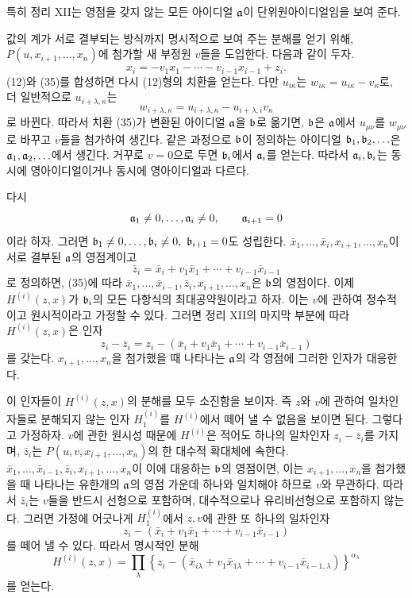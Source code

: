 특히 정리 XII는 영점을 갖지 않는 모든 아이디얼 \(\mathfrak a\)이 단위원아이디얼임을 보여 준다.

값의 계가 서로 결부되는 방식까지 명시적으로 보여 주는 분해를 얻기 위해, \(P(u,x_{i+1},\ldots,x_n)\)에 첨가할 새 부정원 \(v\)들을 도입한다. 다음과 같이 두자.
\begin{equation}
x_i=-v_1x_1-\cdots-v_{i-1}x_{i-1}+z_i.
\tag{35}
\end{equation}
(12)와 (35)를 합성하면 다시 (12)형의 치환을 얻는다. 다만 \(u_{i\kappa}\)는 \(w_{i\kappa}=u_{i\kappa}-v_\kappa\)로, 더 일반적으로 \(u_{i+\lambda,\kappa}\)는
\[
w_{i+\lambda,\kappa}
=u_{i+\lambda,\kappa}-u_{i+\lambda,i}v_\kappa
\]
로 바뀐다. 따라서 치환 (35)가 변환된 아이디얼 \(\mathfrak a\)을 \(\mathfrak b\)로 옮기면, \(\mathfrak b\)은 \(\mathfrak a\)에서 \(u_{\mu\nu}\)를 \(w_{\mu\nu}\)로 바꾸고 \(v\)들을 첨가하여 생긴다. 같은 과정으로 \(\mathfrak b\)이 정의하는 아이디얼 \(\mathfrak b_1,\mathfrak b_2,\ldots\)은 \(\mathfrak a_1,\mathfrak a_2,\ldots\)에서 생긴다. 거꾸로 \(v=0\)으로 두면 \(\mathfrak b_i\)에서 \(\mathfrak a_i\)를 얻는다. 따라서 \(\mathfrak a_i,\mathfrak b_i\)는 동시에 영아이디얼이거나 동시에 영아이디얼과 다르다.

다시
\[
\mathfrak a_1\ne0,\ldots,\mathfrak a_i\ne0,\qquad\mathfrak a_{i+1}=0
\]
이라 하자. 그러면 \(\bideal_1\ne0,\ldots,\bideal_i\ne0,\ \bideal_{i+1}=0\)도 성립한다. \(\bar x_1,\ldots,\bar x_i,x_{i+1},\ldots,x_n\)이 서로 결부된 \(\mathfrak a\)의 영점계이고
\[
\bar z_i=\bar x_i+v_1\bar x_1+\cdots+v_{i-1}\bar x_{i-1}
\]
로 정의하면, (35)에 따라 \(\bar x_1,\ldots,\bar x_{i-1},\bar z_i,x_{i+1},\ldots,x_n\)은 \(\mathfrak b\)의 영점이다. 이제 \(H^{(i)}(z,x)\)가 \(\mathfrak b_i\)의 모든 다항식의 최대공약원이라고 하자. 이는 \(v\)에 관하여 정수적이고 원시적이라고 가정할 수 있다. 그러면 정리 XII의 마지막 부분에 따라 \(H^{(i)}(z,x)\)은 인자
\[
z_i-\bar z_i
=z_i-(\bar x_i+v_1\bar x_1+\cdots+v_{i-1}\bar x_{i-1})
\]
를 갖는다. \(x_{i+1},\ldots,x_n\)을 첨가했을 때 나타나는 \(\mathfrak a\)의 각 영점에 그러한 인자가 대응한다.

이 인자들이 \(H^{(i)}(z,x)\)의 분해를 모두 소진함을 보이자. 즉 \(z\)와 \(v\)에 관하여 일차인자들로 분해되지 않는 인자 \(H_1^{(i)}\)를 \(H^{(i)}\)에서 떼어 낼 수 없음을 보이면 된다. 그렇다고 가정하자. \(v\)에 관한 원시성 때문에 \(H^{(i)}\)은 적어도 하나의 일차인자 \(z_i-\bar z_i\)를 가지며, \(\bar z_i\)는 \(P(u,v,x_{i+1},\ldots,x_n)\)의 한 대수적 확대체에 속한다. \(\bar x_1,\ldots,\bar x_{i-1},\bar z_i,x_{i+1},\ldots,x_n\)이 이에 대응하는 \(\mathfrak b\)의 영점이면, 이는 \(x_{i+1},\ldots,x_n\)을 첨가했을 때 나타나는 유한개의 \(\mathfrak a\)의 영점 가운데 하나와 일치해야 하므로 \(v\)와 무관하다. 따라서 \(\bar z_i\)는 \(v\)들을 반드시 선형으로 포함하며, 대수적으로나 유리비선형으로 포함하지 않는다. 그러면 가정에 어긋나게 \(H_1^{(i)}\)에서 \(z,v\)에 관한 또 하나의 일차인자
\[
z_i-(\bar x_i+v_1\bar x_1+\cdots+v_{i-1}\bar x_{i-1})
\]
를 떼어 낼 수 있다. 따라서 명시적인 분해
\[
H^{(i)}(z,x)=
\prod_\lambda
\left\{z_i-(\bar x_{i\lambda}+v_1\bar x_{1\lambda}
+\cdots+v_{i-1}\bar x_{i-1,\lambda})\right\}^{\alpha_\lambda}
\]
를 얻는다.

